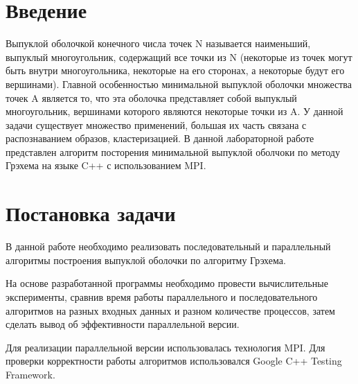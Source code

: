 \documentclass{report}
\begin{document}
\setcounter{page}{2}

\newpage

\section*{Введение}
Выпуклой оболочкой конечного числа точек N называется наименьший, выпуклый многоугольник, содержащий все точки из N (некоторые из точек могут быть внутри многоугольника, некоторые на его сторонах, а некоторые будут его вершинами). Главной особенностью минимальной выпуклой оболочки множества точек A является то, что эта оболочка представляет собой выпуклый многоугольник, вершинами которого являются некоторые точки из A. У данной задачи существует множество применений, большая их часть связана с распознаванием образов, кластеризацией. В данной лабораторной работе представлен алгоритм посторения минимальной выпуклой оболчоки по методу Грэхема на языке C++ с использованием MPI.

\newpage

\section*{Постановка задачи}
В данной работе необходимо реализовать последовательный и параллельный алгоритмы построения выпуклой оболочки по алгоритму Грэхема. 
\par
На основе разработанной программы необходимо провести вычислительные эксперименты, сравнив время работы параллельного и последовательного алгоритмов на разных входных данных и разном количестве процессов, затем сделать вывод об эффективности параллельной версии.
\par
Для реализации параллельной версии использовалась технология MPI. Для проверки корректности работы алгоритмов использовался Google C++ Testing Framework.
\newpage

\end{document}
